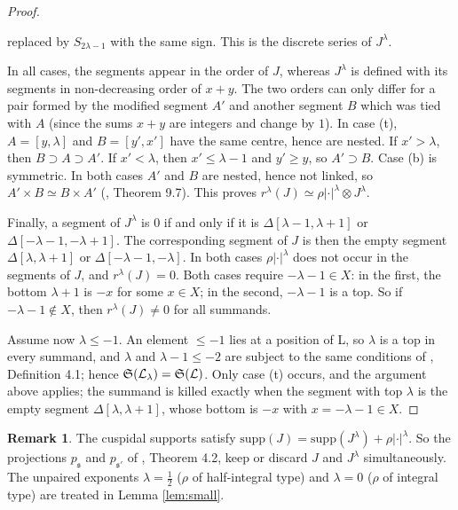 \documentclass[a4paper,12pt,leqno]{amsart}
\theoremstyle{plain}
\theoremstyle{definition}
\newtheorem{rmk}[thm]{Remark}
\providecommand{\frS}{\mathfrak{S}}\providecommand{\frs}{\mathfrak{s}}
\begin{document}
\begin{proof}
\begin{itemize}
replaced by $S_{2\lambda-1}$ with the same sign. This is the discrete series of $J^\lambda$.
\end{itemize}
In all cases, the segments appear in the order of $J$, whereas $J^\lambda$ is defined with its segments in
non-decreasing order of $x+y$. The two orders can only differ for a pair formed by the modified
segment $A'$ and another segment $B$ which was tied with $A$ (since the sums $x+y$ are integers and
change by $1$). In case (t), $A=[y,\lambda]$ and $B=[y',x']$ have the same centre, hence are
nested. If $x'>\lambda$, then $B\supset A\supset A'$. If $x'<\lambda$, then $x'\leq\lambda-1$ and
$y'\geq y$, so $A'\supset B$. Case (b) is symmetric. In both cases $A'$ and $B$ are nested, hence not
linked, so $A'\times B\simeq B\times A'$ (\cite{Zel80}, Theorem 9.7). This proves
$r^\lambda(J)\simeq\rho|\cdot|^\lambda\otimes J^\lambda$.

Finally, a segment of $J^\lambda$ is $0$ if and only if it is $\Delta[\lambda-1,\lambda+1]$ or
$\Delta[-\lambda-1,-\lambda+1]$. The corresponding segment of $J$ is then the empty segment
$\Delta[\lambda,\lambda+1]$ or $\Delta[-\lambda-1,-\lambda]$. In both cases $\rho|\cdot|^\lambda$ does not
occur in the segments of $J$, and $r^\lambda(J)=0$. Both cases require $-\lambda-1\in X$: in the first, the bottom
$\lambda+1$ is $-x$ for some $x\in X$; in the second, $-\lambda-1$ is a top. So if
$-\lambda-1\notin X$, then $r^\lambda(J)\neq0$ for all summands.

Assume now $\lambda\leq-1$. An element $\leq-1$ lies at a position of L, so $\lambda$ is a top in every
summand, and $\lambda$ and $\lambda-1\leq-2$ are subject to the same conditions of \cite{Ato24},
Definition 4.1; hence $\frS(\caL_\lambda)=\frS(\caL)$. Only case (t) occurs, and the argument above
applies; the summand is killed exactly when the segment with top $\lambda$ is the empty segment
$\Delta[\lambda,\lambda+1]$, whose bottom is $-x$ with $x=-\lambda-1\in X$.
\end{proof}

\begin{rmk} The cuspidal supports satisfy $\mathrm{supp}(J)=\mathrm{supp}(J^\lambda)+\rho|\cdot|^\lambda$.
So the projections $p_\frs$ and $p_{\frs'}$ of \cite{Ato24}, Theorem 4.2, keep or discard $J$ and
$J^\lambda$ simultaneously. The unpaired exponents $\lambda=\tfrac12$ ($\rho$ of half-integral type) and
$\lambda=0$ ($\rho$ of integral type) are treated in Lemma \ref{lem:small}.
\end{rmk}
\end{document}
